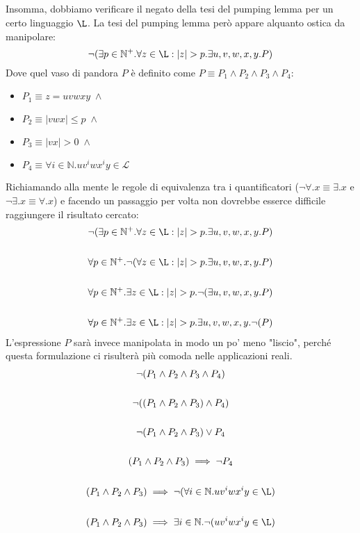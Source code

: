 \documentclass[class=book, crop=false, oneside, 12pt]{standalone}
\begin{document}
  \subparagraph*{}
  Insomma, dobbiamo verificare il negato della tesi del pumping lemma per un certo linguaggio \(\L\). La tesi del pumping lemma però appare alquanto ostica da manipolare:
  \begin{equation*}
    \neg(\exists p \in \mathbb{N}^+. \forall z \in \L: |z| > p. \exists u, v, w, x, y. P)
  \end{equation*}
  Dove quel vaso di pandora \(P\) è definito come \(P \equiv P_1 \land P_2 \land P_3 \land P_4\):
  \begin{itemize}
    \item \(P_1 \equiv z = uvwxy \; \land\)
    \item \(P_2 \equiv |vwx| \leq p \; \land\)
    \item \(P_3 \equiv |vx| > 0 \; \land\)
    \item \(P_4 \equiv \forall i \in \mathbb{N}.uv^iwx^iy \in \mathcal{L}\)
  \end{itemize}
  Richiamando alla mente le regole di equivalenza tra i quantificatori (\(\neg\forall.x \equiv \exists.x\) e \(\neg\exists.x \equiv \forall.x\)) e facendo un passaggio per volta non dovrebbe esserce difficile raggiungere il risultato cercato:
  \begin{gather*}
    \neg(\exists p \in \mathbb{N}^+. \forall z \in \L: |z| > p. \exists u, v, w, x, y. P) \\
    \\
    \forall p \in \mathbb{N}^+. \neg(\forall z \in \L: |z| > p. \exists u, v, w, x, y. P) \\
    \\
    \forall p \in \mathbb{N}^+. \exists z \in \L: |z| > p. \neg(\exists u, v, w, x, y. P) \\
    \\
    \forall p \in \mathbb{N}^+. \exists z \in \L: |z| > p. \exists u, v, w, x, y. \neg(P)
  \end{gather*}
  L'espressione \(P\) sarà invece manipolata in modo un po' meno "liscio", perché questa formulazione ci risulterà più comoda nelle applicazioni reali.
  \begin{gather*}
    \neg(P_1 \land P_2 \land P_3 \land P_4) \\
    \\
    \neg((P_1 \land P_2 \land P_3) \land P_4) \\
    \\
    \neg(P_1 \land P_2 \land P_3) \lor P_4 \\
    \\
    (P_1 \land P_2 \land P_3) \implies \neg P_4 \\
    \\
    (P_1 \land P_2 \land P_3) \implies \neg(\forall i \in \mathbb{N}.uv^iwx^iy \in \L) \\
    \\
    (P_1 \land P_2 \land P_3) \implies \exists i \in \mathbb{N}. \neg(uv^iwx^iy \in \L)
  \end{gather*}
\end{document}
